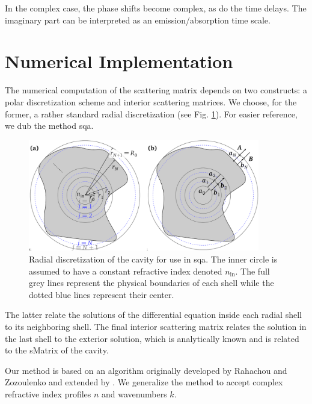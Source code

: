 In the complex case, the phase shifts become complex, as do the 
time delays. The imaginary part can be interpreted as an 
emission/absorption time scale. 

\section{Numerical Implementation}
The numerical computation of the scattering matrix 
depends on two constructs: a polar discretization 
scheme and interior scattering matrices. We choose, for
the former, a rather standard radial discretization (see Fig. \ref{fig:passive.numerical.radialDiscretization}).
For easier reference, we dub the method \gls{sqa}.

\begin{figure}
 \centering
 \includegraphics[width=0.9\textwidth]{figs/passive/figDisScatCoeff.pdf}
 \caption[Radial discretization for use in SQA]
	 {Radial discretization of the cavity for use in \gls{sqa}. The inner circle is assumed to 
	 have a constant refractive index denoted $n_\text{in}$. The full grey lines represent
	 the physical boundaries of each shell while the dotted blue lines represent their
	 center.}
  \label{fig:passive.numerical.radialDiscretization}
\end{figure}


The latter relate the solutions of the differential equation 
inside each radial shell to its neighboring shell. The final
interior scattering matrix relates the solution in the last shell
to the exterior solution, which is analytically known and is 
related to the \gls{sMatrix} of the cavity.

Our method is based on an algorithm originally developed by 
Rahachou and Zozoulenko \cite{RAH2004} and extended by \cite{GAP2013}. 
We generalize the method to accept complex refractive index
profiles $n$ and wavenumbers $k$. 

